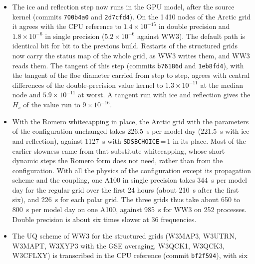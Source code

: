 \documentclass[11pt,a4paper]{article}
\begin{document}
\begin{itemize}
reference (commit \texttt{d6aca8e}). They are checked against WW3 built
from the library of the IRI configuration, on 1\,410 nodes of the Arctic
grid from a six-hour state, 1\,259 of them with ice and 370 with
reflection. The largest relative differences are $1.7\times10^{-6}$ for
W3SIS2, $2.1\times10^{-7}$ for W3SIC2, $2.1\times10^{-6}$ for W3SREF,
and $5.0\times10^{-6}$ for the whole of W3SRCE with ice and reflection.
In the tangents, the break-up of the ice, the concentration window of
IS2 and the clips of W3SREF are not differentiable, and the coastal
geometry is fixed.
\item The ice and reflection step now runs in the GPU model, after the
source kernel (commits \texttt{700b4a0} and \texttt{2d7cfd4}). On the
1\,410 nodes of the Arctic grid it agrees with the CPU reference to
$1.4\times10^{-15}$ in double precision and $1.8\times10^{-6}$ in single
precision ($5.2\times10^{-6}$ against WW3). The default path is
identical bit for bit to the previous build. Restarts of the structured
grids now carry the status map of the whole grid, as WW3 writes them,
and WW3 reads them. The tangent of this step (commits \texttt{b76186d}
and \texttt{1eb8fd4}), with the tangent of the floe diameter carried
from step to step, agrees with central differences of the
double-precision value kernel to $1.3\times10^{-11}$ at the median node
and $5.9\times10^{-11}$ at worst. A tangent run with ice and reflection
gives the $H_s$ of the value run to $9\times10^{-16}$.
\item With the Romero whitecapping in place, the Arctic grid with the
parameters of the configuration unchanged takes \SI{226.5}{s} per model
day (\SI{221.5}{s} with ice and reflection), against \SI{1127}{s} with
\texttt{SDSBCHOICE}\,=\,1 in its place. Most of the earlier slowness
came from that substitute whitecapping, whose short dynamic steps the
Romero form does not need, rather than from the configuration. With
all the physics of the configuration except its propagation scheme and
the coupling, one A100 in single precision takes \SI{344}{s} per model
day for the regular grid over the first 24 hours (about \SI{210}{s}
after the first six), and \SI{226}{s} for each polar grid. The three
grids thus take about 650 to \SI{800}{s} per model day on one A100,
against \SI{985}{s} for WW3 on 252 processes. Double precision is
about six times slower at 36 frequencies.
\item The UQ scheme of WW3 for the structured grids (W3MAP3, W3UTRN,
W3MAPT, W3XYP3 with the GSE averaging, W3QCK1, W3QCK3, W3CFLXY) is
transcribed in the CPU reference (commit \texttt{bf2f594}), with six

\end{itemize}
\end{document}
